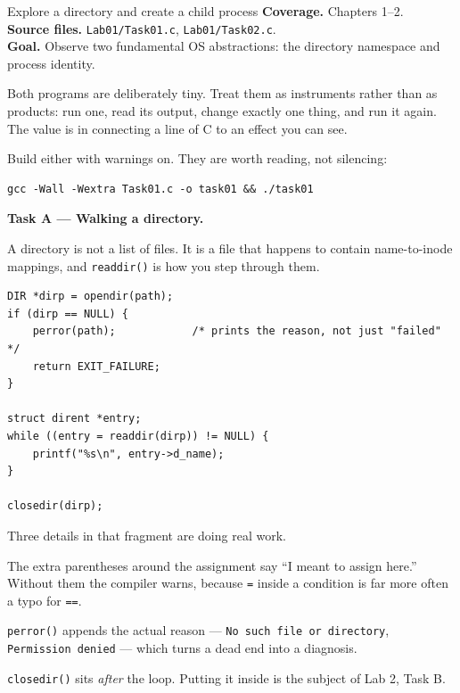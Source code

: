 \begin{labproject}{Explore a directory and create a child process}
\textbf{Coverage.} Chapters 1--2.\\
\textbf{Source files.} \texttt{Lab01/Task01.c}, \texttt{Lab01/Task02.c}.\\
\textbf{Goal.} Observe two fundamental OS abstractions: the directory namespace and process identity.

\begin{labmode}
Both programs are deliberately tiny. Treat them as instruments rather than as products: run one, read its output, change exactly one thing, and run it again. The value is in connecting a line of C to an effect you can see.

Build either with warnings on. They are worth reading, not silencing:
\begin{lstlisting}[style=osbash]
gcc -Wall -Wextra Task01.c -o task01 && ./task01
\end{lstlisting}
\end{labmode}

\medskip\noindent\textbf{Task A --- Walking a directory.}\par
A directory is not a list of files. It is a file that happens to contain name-to-inode mappings, and \texttt{readdir()} is how you step through them.

\begin{lstlisting}[style=osc]
DIR *dirp = opendir(path);
if (dirp == NULL) {
    perror(path);            /* prints the reason, not just "failed" */
    return EXIT_FAILURE;
}

struct dirent *entry;
while ((entry = readdir(dirp)) != NULL) {
    printf("%s\n", entry->d_name);
}

closedir(dirp);
\end{lstlisting}

Three details in that fragment are doing real work.

The extra parentheses around the assignment say ``I meant to assign here.'' Without them the compiler warns, because \texttt{=} inside a condition is far more often a typo for \texttt{==}.

\texttt{perror()} appends the actual reason --- \texttt{No such file or directory}, \texttt{Permission denied} --- which turns a dead end into a diagnosis.

\texttt{closedir()} sits \emph{after} the loop. Putting it inside is the subject of Lab 2, Task B.


\end{labproject}
